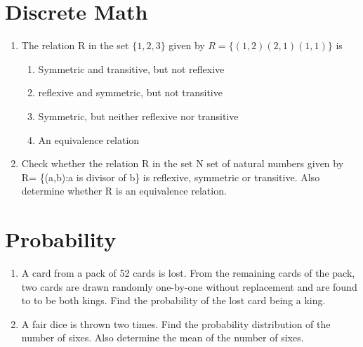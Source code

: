\documentclass[journal,12pt,twocolumn]{IEEEtran}
\begin{document}
 \section{Discrete Math }
\begin{enumerate}
\item  The relation R in the set $ \{1,2,3\}$  given by $R=\{(1,2)(2,1)(1,1)\}$ is

\begin{enumerate}
    \item Symmetric and transitive, but not reflexive  \\
    \item reflexive and symmetric, but not transitive  \\
    \item Symmetric, but neither reflexive nor transitive \\
    \item An equivalence relation 
\end{enumerate}
  \item Check whether the relation R in the set N set of natural numbers given by R= \{(a,b):a is divisor of b\} is reflexive, symmetric or transitive. Also determine whether R is an equivalence relation. 
\end{enumerate}
 \section{Probability}
\begin{enumerate}
\item A card from a pack of 52 cards is lost. From the remaining cards of the pack, two cards are drawn randomly one-by-one without replacement and are found to to be both kings. Find the probability of the lost card being a king.\\

\item A fair dice is thrown two times. Find the probability distribution of the number of sixes. Also determine the mean of the number of sixes.\\

\end{enumerate}
\end{document}
